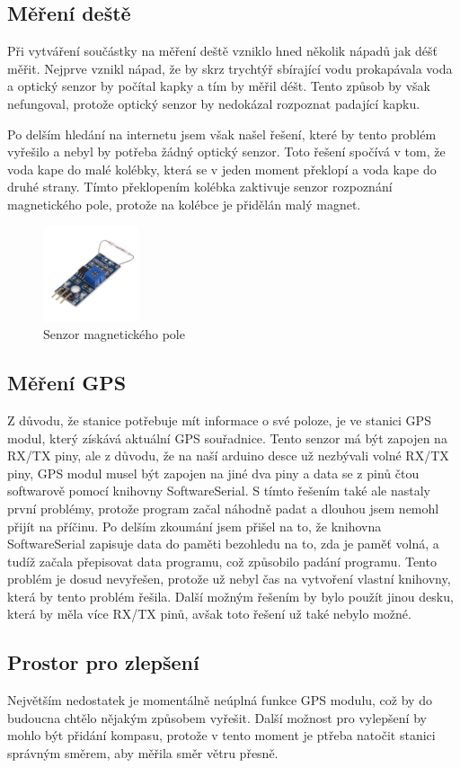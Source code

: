 \subsection{Měření deště}
Při vytváření součástky na měření deště vzniklo hned několik nápadů jak déšť měřit. Nejprve vznikl nápad, že by skrz trychtýř sbírající vodu prokapávala voda a optický senzor by počítal kapky a tím by měřil déšt.
Tento způsob by však nefungoval, protože optický senzor by nedokázal rozpoznat padající kapku.

Po delším hledání na internetu jsem však našel řešení\cite{mereni_deste}, které by tento problém vyřešilo a nebyl by potřeba žádný optický senzor. Toto řešení spočívá v tom, že voda kape do malé kolébky, která se v jeden moment překlopí a voda kape do druhé strany.
Tímto překlopením kolébka zaktivuje senzor rozpoznání magnetického pole, protože na kolébce je přidělán malý magnet.

\begin{figure}[h] 
    \centering
    \includegraphics[width=0.25\textwidth]{images/magnet_sensor.jpg}
    \caption{Senzor magnetického pole}
\end{figure}

\subsection{Měření GPS}
Z důvodu, že stanice potřebuje mít informace o své poloze, je ve stanici GPS modul, který získává aktuální GPS souřadnice. Tento senzor má být zapojen na RX/TX piny, ale z důvodu, že na naší arduino desce už
nezbývali volné RX/TX piny, GPS modul musel být zapojen na jiné dva piny a data se z pinů čtou softwarově pomocí knihovny SoftwareSerial. S tímto řešením také ale nastaly první problémy, protože program začal náhodně padat a dlouhou jsem nemohl přijít na příčinu.
Po delším zkoumání jsem přišel na to, že knihovna SoftwareSerial zapisuje data do paměti bezohledu na to, zda je paměť volná, a tudíž začala přepisovat data programu, což způsobilo padání programu.
Tento problém je dosud nevyřešen, protože už nebyl čas na vytvoření vlastní knihovny, která by tento problém řešila. Další možným řešením by bylo použít jinou desku, která by měla více RX/TX pinů, avšak toto řešení už také nebylo možné.

\subsection{Prostor pro zlepšení}
Největším nedostatek je momentálně neúplná funkce GPS modulu, což by do budoucna chtělo nějakým způsobem vyřešit.
Další možnost pro vylepšení by mohlo být přidání kompasu, protože v tento moment je ptřeba natočit stanici správným směrem, aby měřila směr větru přesně. 


